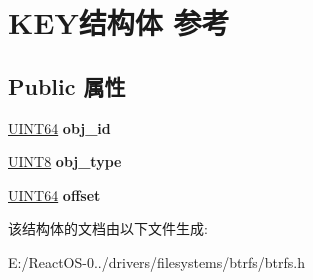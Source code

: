 \hypertarget{struct_k_e_y}{}\section{K\+E\+Y结构体 参考}
\label{struct_k_e_y}
\subsection*{Public 属性}
\begin{DoxyCompactItemize}
\item 
\mbox{\label{struct_k_e_y_ac43a03cd6a604f7ba3e84903898b9889}} 
\hyperlink{_processor_bind_8h_a57be03562867144161c1bfee95ca8f7c}{U\+I\+N\+T64} {\bfseries obj\+\_\+id}
\item 
\mbox{\label{struct_k_e_y_ae9ce6060a63206396b992be98ec2b5ea}} 
\hyperlink{_processor_bind_8h_ab27e9918b538ce9d8ca692479b375b6a}{U\+I\+N\+T8} {\bfseries obj\+\_\+type}
\item 
\mbox{\label{struct_k_e_y_a0a2ee914bb6071828a78f08fde805a09}} 
\hyperlink{_processor_bind_8h_a57be03562867144161c1bfee95ca8f7c}{U\+I\+N\+T64} {\bfseries offset}
\end{DoxyCompactItemize}


该结构体的文档由以下文件生成\+:\begin{DoxyCompactItemize}
\item 
E\+:/\+React\+O\+S-\/0../drivers/filesystems/btrfs/btrfs.\+h\end{DoxyCompactItemize}
